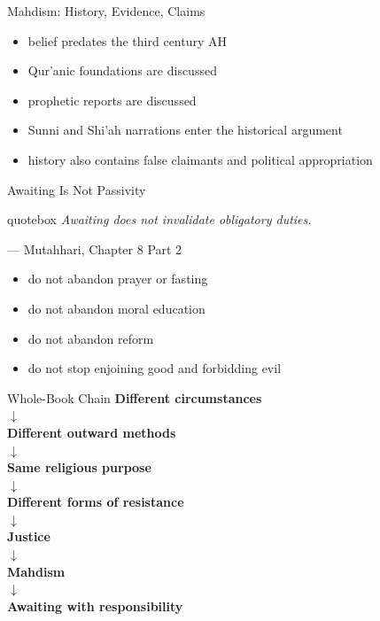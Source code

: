 \documentclass[11pt,aspectratio=169]{beamer}
\newcommand{\bigquote}[2]{%
\begin{beamercolorbox}[wd=\linewidth,sep=6pt]{quotebox}
{\large\itshape\color{deepteal}#1}\par
{\footnotesize --- #2}
\end{beamercolorbox}}
\begin{document}
\begin{frame}{Mahdism: History, Evidence, Claims}
\begin{itemize}
\item belief predates the third century AH
\item Qur'anic foundations are discussed
\item prophetic reports are discussed
\item Sunni and Shi'ah narrations enter the historical argument
\item history also contains false claimants and political appropriation
\end{itemize}
\end{frame}

\begin{frame}{Awaiting Is Not Passivity}
\bigquote{Awaiting does not invalidate obligatory duties.}{Mutahhari, Chapter 8 Part 2}
\begin{itemize}
\item do not abandon prayer or fasting
\item do not abandon moral education
\item do not abandon reform
\item do not stop enjoining good and forbidding evil
\end{itemize}
\end{frame}

\begin{frame}{Whole-Book Chain}
\centering\Large
\textbf{Different circumstances}\\[4pt]
$\downarrow$\\[4pt]
\textbf{Different outward methods}\\[4pt]
$\downarrow$\\[4pt]
\textbf{Same religious purpose}\\[4pt]
$\downarrow$\\[4pt]
\textbf{Different forms of resistance}\\[4pt]
$\downarrow$\\[4pt]
\textbf{Justice}\\[4pt]
$\downarrow$\\[4pt]
\textbf{Mahdism}\\[4pt]
$\downarrow$\\[4pt]
\textbf{Awaiting with responsibility}
\end{frame}
\end{document}
